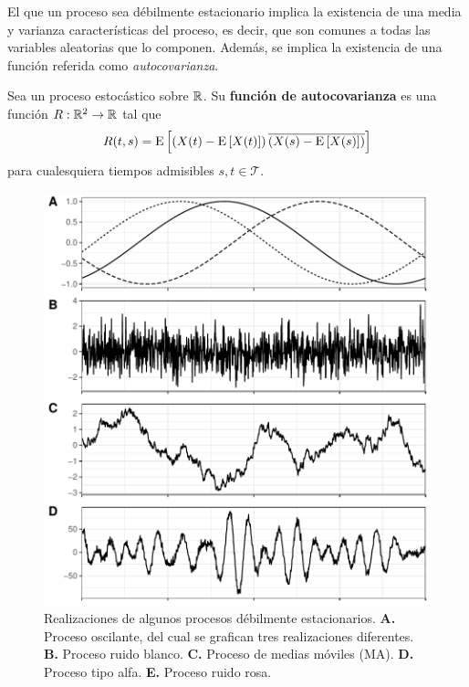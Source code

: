 El que un proceso sea débilmente estacionario implica la existencia de una media y varianza características del proceso, es decir, que son comunes a todas las variables aleatorias que lo componen. 
%
Además, se implica la existencia de una función referida como \textit{autocovarianza}.

\begin{definicion}
Sea \xt un proceso estocástico sobre $\mathbb{R}$. Su \textbf{función de autocovarianza} es una función $R: \mathbb{R}^{2}\rightarrow \mathbb{R}$ tal que
\begin{equation}
R(t,s) = \mathrm{E}\left[ \left(X(t) - \mathrm{E}\left[ X(t) \right]\right)\overline{\left(X(s) - \mathrm{E}\left[ X(s) \right]\right)} \right]
\end{equation} 
para cualesquiera tiempos admisibles $s, t \in \mathcal{T}$.
\end{definicion}

\begin{figure}
\centering
\includegraphics[width=\linewidth]{./img_mas_ejemplos/ruidos_ejemplos.pdf}
\caption[Realizaciones de algunos proceso débilmente estacionarios]{Realizaciones de algunos procesos débilmente estacionarios. \textbf{A.} Proceso oscilante, del cual se grafican tres realizaciones diferentes. \textbf{B.} Proceso ruido blanco. \textbf{C.} Proceso de medias móviles (MA). \textbf{D.} Proceso tipo alfa. \textbf{E.} Proceso ruido rosa.}
\end{figure}


